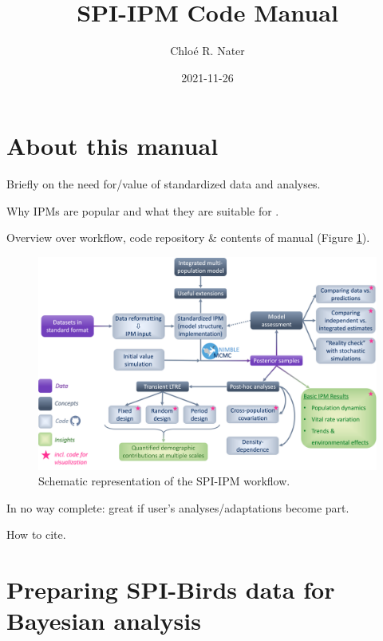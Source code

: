 \documentclass[
]{book}
\title{SPI-IPM Code Manual}
\author{Chloé R. Nater}
\date{2021-11-26}
\begin{document}
\maketitle

{
\setcounter{tocdepth}{1}
\tableofcontents
}
\hypertarget{about-this-manual}{%
\chapter*{About this manual}\label{about-this-manual}}

Briefly on the need for/value of standardized data and analyses.

Why IPMs are popular and what they are suitable for \citep{kery2011, plard2019}.

Overview over workflow, code repository \& contents of manual (Figure \ref{fig:WorkflowDiag}).

\begin{figure}

{\centering \includegraphics[width=1\linewidth]{Figures/SPI-IPM_Workflow} 

}

\caption{Schematic representation of the SPI-IPM workflow.}\label{fig:WorkflowDiag}
\end{figure}

In no way complete: great if user's analyses/adaptations become part.

How to cite.

\hypertarget{DataPrep}{%
\chapter{Preparing SPI-Birds data for Bayesian analysis}\label{DataPrep}}
\end{document}
